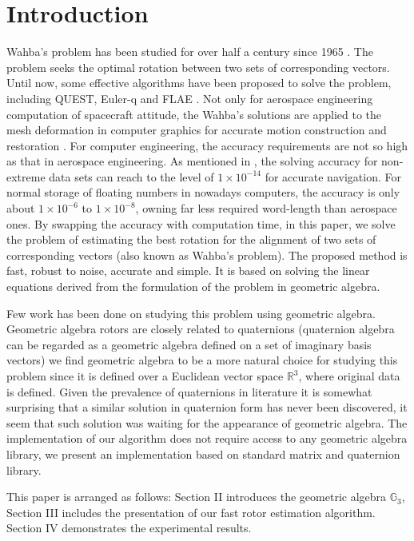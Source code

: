 \documentclass{birkjour}
\numberwithin{equation}{section}
\begin{document}
\section{Introduction}

\indent Wahba's problem has been studied for over half a century since 1965 \cite{Wahba1965}. The problem seeks the optimal rotation between two sets of corresponding vectors. Until now, some effective algorithms have been proposed to solve the problem, including QUEST, Euler-q and FLAE \cite{Mortari1996,Shuster1981,Wu2017,Yang2015}. Not only for aerospace engineering computation of spacecraft attitude, the Wahba's solutions are applied to the mesh deformation in computer graphics \cite{Sorkine2007, Sin2013} for accurate motion construction and restoration \cite{Nieto2012,Perwass2009}. For computer engineering, the accuracy requirements are not so high as that in aerospace engineering. As mentioned in \cite{Wu2017}, the solving accuracy for non-extreme data sets can reach to the level of $1\times10^{-14}$ for accurate navigation. For normal storage of floating numbers in nowadays computers, the accuracy is only about $1\times10^{-6}$ to $1\times10^{-8}$, owning far less required word-length than aerospace ones. By swapping the accuracy with computation time, in this paper, we solve the problem of estimating the best rotation for the alignment of two sets of corresponding vectors (also known as Wahba's problem). The proposed method is fast, robust to noise, accurate and simple. It is based on solving the linear equations derived from the formulation of the problem in geometric algebra.

Few work has been done on studying this problem using geometric algebra. Geometric algebra rotors are closely related to quaternions (quaternion algebra can be regarded as a geometric algebra defined on a set of imaginary basis vectors) we find geometric algebra to be a more natural choice for studying this problem since it is defined over a Euclidean vector space $\mathbb R^3$, where original data is defined. Given the prevalence of quaternions in literature it is somewhat surprising that a similar solution in quaternion form has never been discovered, it seem that such solution was waiting for the appearance of geometric algebra. The implementation of our algorithm does not require access to any geometric algebra library, we present an implementation based on standard matrix and quaternion library. 

\indent This paper is arranged as follows: Section II introduces the geometric algebra $\mathbb{G}_3$, Section III includes the presentation of our fast rotor estimation algorithm. Section IV demonstrates the experimental results.
\end{document}
